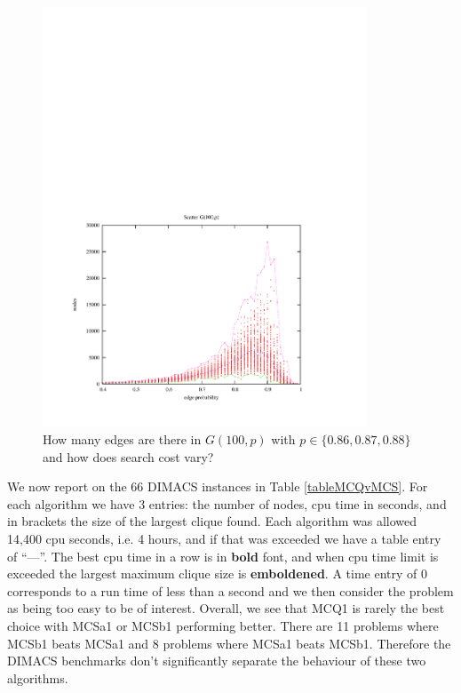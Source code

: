 \documentclass{l4proj}
\begin{document}
\begin{figure}
\begin{center}
\begin{minipage}[t]{0.49\textwidth}
\includegraphics[height=12.5cm]{scatter-100.pdf}
\end{minipage}
\end{center}
\caption{How many edges are there in $G(100,p)$ with $p \in \{0.86,0.87,0.88\}$ and how does search cost vary?}
\label{edges}
\end{figure}

We now report on the 66 DIMACS instances \cite{DIMACS} in Table \ref{tableMCQvMCS}. 
For each algorithm we have 3 entries: the number of nodes, cpu time in seconds, and in brackets the size of the largest clique found.
Each algorithm was allowed 14,400 cpu seconds, i.e. 4 hours, and if that was exceeded we have a table entry of ``---''. The best cpu
time in a row is in {\bf bold} font, and when cpu time limit is exceeded the largest maximum clique size is {\bf emboldened}.  A time entry
of 0 corresponds to a run time of less than a second and we then consider the problem as being too easy to be of
interest. Overall, we see that MCQ1 is rarely the best choice with MCSa1 or MCSb1 performing better. There are 11 problems where
MCSb1 beats MCSa1 and 8 problems where MCSa1 beats MCSb1. Therefore the DIMACS benchmarks don't significantly separate 
the behaviour of these two algorithms.
\end{document}
